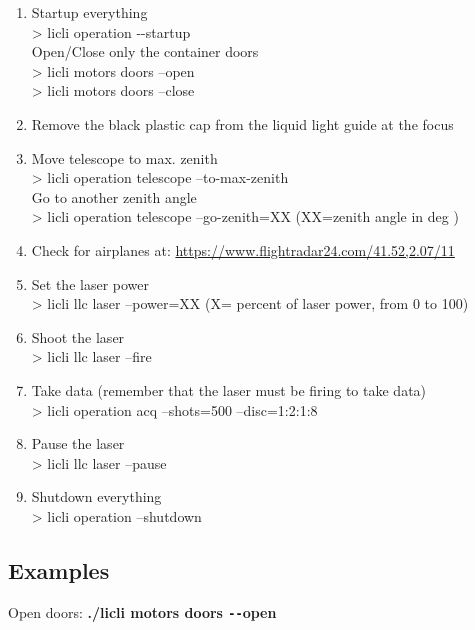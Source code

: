 \documentclass[letterpaper, 10 pt]{article}
\begin{document}
\begin{enumerate}
	\item Startup everything\\
	 > licli operation -{}-startup\\
	 
	Open/Close only the container doors \\
		> licli motors doors --open\\
		> licli motors doors --close\\
		
	\item Remove the black plastic cap from the liquid light guide at the focus \\
	\item Move telescope to max. zenith\\
	> licli operation telescope --to-max-zenith\\
	
	Go to another zenith angle\\
	> licli operation telescope --go-zenith=XX       (XX=zenith angle in deg ) \\
	\item Check for airplanes at: \url{https://www.flightradar24.com/41.52,2.07/11}\\
	\item Set the laser power\\
	> licli llc laser --power=XX    (X= percent of laser power, from 0 to 100)\\
	\item Shoot the laser\\
	> licli llc laser --fire\\
	\item Take data (remember that the laser must be firing to take data) \\
	> licli operation acq --shots=500 --disc=1:2:1:8\\
	\item Pause the laser\\
	> licli llc laser --pause\\
	\item Shutdown everything\\
	> licli operation --shutdown 
\end{enumerate}

\subsection{Examples}
Open doors: \textbf{./licli motors doors \texttt{-{}-}open}
\end{document}
